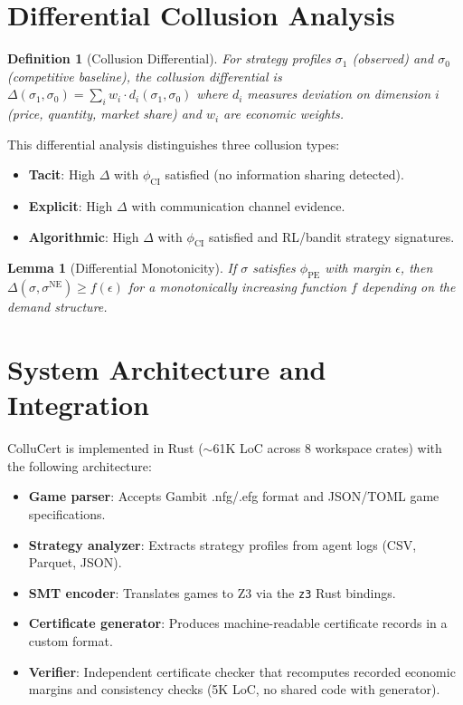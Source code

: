 \documentclass[11pt]{article}
\newtheorem{definition}[theorem]{Definition}
\newtheorem{lemma}[theorem]{Lemma}
\begin{document}
\section{Differential Collusion Analysis}
\label{sec:differential}

\begin{definition}[Collusion Differential]
For strategy profiles $\sigma_1$ (observed) and $\sigma_0$ (competitive baseline), the collusion differential is $\Delta(\sigma_1, \sigma_0) = \sum_{i} w_i \cdot d_i(\sigma_1, \sigma_0)$ where $d_i$ measures deviation on dimension $i$ (price, quantity, market share) and $w_i$ are economic weights.
\end{definition}

This differential analysis distinguishes three collusion types:
\begin{itemize}
\item \textbf{Tacit}: High $\Delta$ with $\phi_{\text{CI}}$ satisfied (no information sharing detected).
\item \textbf{Explicit}: High $\Delta$ with communication channel evidence.
\item \textbf{Algorithmic}: High $\Delta$ with $\phi_{\text{CI}}$ satisfied and RL/bandit strategy signatures.
\end{itemize}

\begin{lemma}[Differential Monotonicity]
\label{lem:mono}
If $\sigma$ satisfies $\phi_{\text{PE}}$ with margin $\epsilon$, then $\Delta(\sigma, \sigma^{\text{NE}}) \geq f(\epsilon)$ for a monotonically increasing function $f$ depending on the demand structure.
\end{lemma}

\section{System Architecture and Integration}
\label{sec:system}

ColluCert is implemented in Rust (${\sim}$61K LoC across 8 workspace crates) with the following architecture:
\begin{itemize}
\item \textbf{Game parser}: Accepts Gambit .nfg/.efg format and JSON/TOML game specifications.
\item \textbf{Strategy analyzer}: Extracts strategy profiles from agent logs (CSV, Parquet, JSON).
\item \textbf{SMT encoder}: Translates games to Z3 via the \texttt{z3} Rust bindings.
\item \textbf{Certificate generator}: Produces machine-readable certificate records in a custom format.
\item \textbf{Verifier}: Independent certificate checker that recomputes recorded economic margins and consistency checks (5K LoC, no shared code with generator).
\end{itemize}
\end{document}
